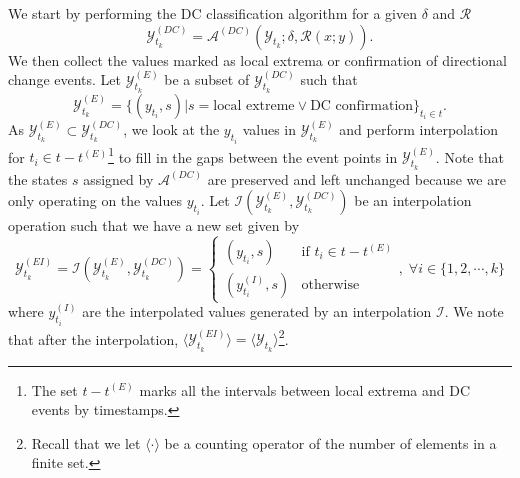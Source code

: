 We start by performing the DC classification algorithm for a given $\delta$ and $\mathcal{R}$
\begin{equation*}
    \mathcal{Y}^{(DC)}_{t_k} = \mathcal{A}^{(DC)} (\mathcal{Y}_{t_k}; \delta, \mathcal{R} (x; y)).
\end{equation*}
We then collect the values marked as local extrema or confirmation of directional change events. Let $\mathcal{Y}^{(E)}_{t_k}$ be a subset of $\mathcal{Y}^{(DC)}_{t_k}$ such that
\begin{equation*}
    \mathcal{Y}^{(E)}_{t_k} = \{(y_{t_i}, s) | s = \text{local extreme} \vee \text{DC confirmation} \}_{t_i \in t}.
\end{equation*}
As $\mathcal{Y}^{(E)}_{t_k} \subset \mathcal{Y}^{(DC)}_{t_k}$, we look at the $y_{t_i}$ values in $\mathcal{Y}^{(E)}_{t_k}$ and perform interpolation for $t_i \in t - t^{(E)}$\footnote{The set $t - t^{(E)}$ marks all the intervals between local extrema and DC events by timestamps.} to fill in the gaps between the event points in $\mathcal{Y}^{(E)}_{t_k}$. Note that the states $s$ assigned by $\mathcal{A}^{(DC)}$ are preserved and left unchanged because we are only operating on the values $y_{t_i}$. Let $\mathcal{I} (\mathcal{Y}^{(E)}_{t_k}, \mathcal{Y}^{(DC)}_{t_k})$ be an interpolation operation such that we have a new set given by
\begin{equation*}
    \mathcal{Y}^{(EI)}_{t_k} = \mathcal{I} (\mathcal{Y}^{(E)}_{t_k}, \mathcal{Y}^{(DC)}_{t_k}) = \begin{cases}
        (y_{t_i}, s)          &\text{if $t_i \in t - t^{(E)}$} \\
        (y^{(I)}_{t_i}, s)    &\text{otherwise}
    \end{cases}, \; \forall i \in \{1, 2, \cdots, k\}
\end{equation*}
where $y^{(I)}_{t_i}$ are the interpolated values generated by an interpolation $\mathcal{I}$. We note that after the interpolation, $\langle \mathcal{Y}^{(EI)}_{t_k} \rangle = \langle \mathcal{Y}_{t_k} \rangle$\footnote{Recall that we let $\langle \cdot \rangle$ be a counting operator of the number of elements in a finite set.}.

